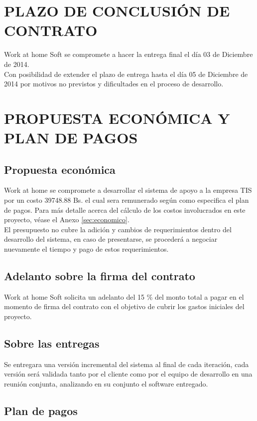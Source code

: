 \documentclass[11pt,letterpaper]{report}
\begin{document}
\chapter{PLAZO DE CONCLUSIÓN DE CONTRATO}
Work at home Soft se compromete a hacer la entrega final el día 03 de Diciembre de 2014.\\
Con posibilidad de extender el plazo de entrega hasta el día 05 de Diciembre de 2014 por motivos no previstos y dificultades en el proceso de desarrollo.

\chapter{PROPUESTA ECONÓMICA Y PLAN DE PAGOS}

\section{Propuesta económica}

Work at home se compromete a desarrollar el sistema de apoyo a la empresa TIS por un costo 39748.88 Bs. el cual sera remunerado según como especifica el plan de pagos.
Para más detalle acerca del cálculo de los costos involucrados en este proyecto, véase el Anexo \ref{sec:economico}.\\
El presupuesto no cubre la adición y cambios de requerimientos dentro del desarrollo del sistema, en caso de presentarse, se procederá a  negociar nuevamente el tiempo y pago de estos requerimientos.

\section{Adelanto sobre la firma del contrato}

Work at home Soft solicita un adelanto del 15 \% del monto total a pagar en el momento de firma del contrato con el objetivo de cubrir los gastos iniciales del proyecto.

\section{Sobre las entregas}
Se entregara una versión incremental del sistema al final de cada iteración, cada versión será validada tanto por el cliente como por el equipo de desarrollo en una reunión conjunta, analizando en su conjunto el software entregado.
\section{Plan de pagos}
\end{document}
